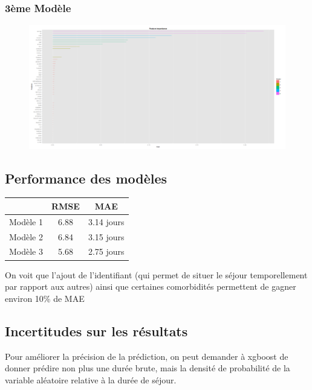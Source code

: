 \documentclass[a4paper,11pt]{article}
\begin{document}
\subsubsection{3ème Modèle}

\begin{figure}[H]
\begin{center}
\includegraphics [width =18cm]{M3.png}
\end{center}
\end{figure}

\subsection{Performance des modèles}

\begin{center}
\begin{tabular}{|c|c|c|}
\hline
 & RMSE & MAE \\
\hline
Modèle 1 & 6.88 & 3.14 jours \\
\hline
Modèle 2 & 6.84 & 3.15 jours \\
\hline
Modèle 3 & 5.68 & 2.75 jours \\
\hline
\end{tabular}
\end{center}

On voit que l'ajout de l'identifiant (qui permet de situer le séjour temporellement par rapport aux autres) ainsi que certaines comorbidités permettent de gagner environ 10\% de MAE

\subsection{Incertitudes sur les résultats}

Pour améliorer la précision de la prédiction, on peut demander à xgboost de donner prédire non plus une durée brute, mais la densité de probabilité de la variable aléatoire relative à la durée de séjour.
\end{document}
